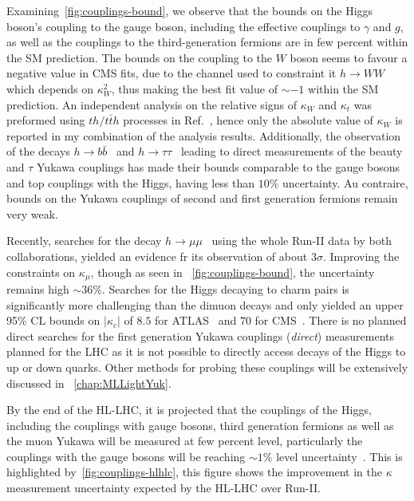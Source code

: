 \par Examining~\autoref{fig:couplings-bound}, we observe that the bounds on the Higgs boson's coupling to the gauge boson, including the effective couplings to $\gamma$ and $g$, as well as the couplings to the third-generation fermions are in few percent within the SM prediction. The bounds on the coupling to the $W$ boson seems to favour a negative value in CMS fits, due to the channel used to constraint it $ h \to WW$ which depends on $ \kappa_W^2$, thus making the best fit value of $ \sim -1$ within the SM prediction. An independent analysis on the relative signs of $\kappa_W$ and $\kappa_t$ was preformed using $th/t \bar{t} h$ processes in Ref.~\cite{CMS:2018jeh}, hence only the absolute value of $\kappa_W$ is reported in my combination of the analysis results.  Additionally,  the observation of the decays $ h \to b \bar{b}$~\cite{CMS:2018nsn,ATLAS:2018kot,ATLAS:2019yhn} and $h \to \tau \tau$~\cite{ATLAS:2018ynr,CMS:2019pyn} leading to direct measurements of the beauty and $\tau$ Yukawa couplings has  made their bounds comparable to the gauge bosons and top couplings with the Higgs, having less than $10\%$ uncertainty.  Au contraire, bounds on the Yukawa couplings of second and first generation fermions remain very weak.  
\par Recently, searches for the decay  $ h\to \mu \mu$~\cite{ATLAS:2020fzp,CMS:2020xwi} using the whole Run-II data by both collaborations, yielded an evidence fr its observation of about $ 3 \sigma$. Improving the constraints on $\kappa_\mu$, though as seen in ~\autoref{fig:couplings-bound}, the uncertainty remains high $ \sim 36 \%$.  Searches for the Higgs decaying to charm pairs is significantly more challenging than the dimuon decays and only yielded an upper 95\% CL  bounds on $ |\kappa_c|$ of $8.5$ for ATLAS~\cite{ATLAS-CONF-2021-021,ATLAS:2022ers} and $70$ for CMS~\cite{CMS:2019hve}. There is no planned direct searches for the first generation Yukawa couplings (\emph{direct}) measurements planned for the LHC as it is not possible to directly access decays of the Higgs to up or down quarks. Other methods for probing these couplings will be extensively discussed in  ~\autoref{chap:MLLightYuk}.
\par By the end of the HL-LHC, it is projected that the couplings of the Higgs, including the couplings with gauge bosons, third generation fermions as well as the muon Yukawa will be measured at few percent level, particularly the couplings with the gauge bosons will be reaching $ \sim 1\%$ level uncertainty~\cite{Bernius:2666331}. This is highlighted by~\autoref{fig:couplings-hlhlc}, this figure shows the improvement in the $\kappa$ measurement uncertainty expected by the HL-LHC over Run-II.
